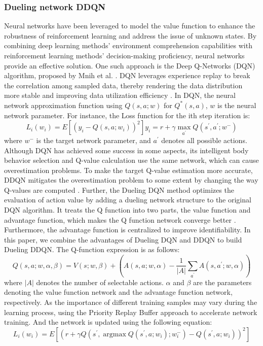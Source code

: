 \documentclass[sn-mathphys]{sn-jnl}%
\theoremstyle{thmstyleone}%
\theoremstyle{thmstyletwo}%
\theoremstyle{thmstylethree}%
\begin{document}
\subsubsection{Dueling network DDQN}
Neural networks have been leveraged to model the value function to enhance the robustness of reinforcement learning and address the issue of unknown states. By combining deep learning methods' environment comprehension capabilities with reinforcement learning methods' decision-making proficiency, neural networks provide an effective solution. One such approach is the Deep Q-Networks (DQN) algorithm, proposed by Mnih et al. \cite{mnihPlayingAtariDeep2013a}. DQN leverages experience replay to break the correlation among sampled data, thereby rendering the data distribution more stable and improving data utilization efficiency \cite{mnihPlayingAtariDeep2013a}. In DQN, the neural network approximation function using $Q(s,a;w)$ for $ Q^*(s,a) $, $ w $ is the neural network parameter. For instance, the Loss function for the ith step iteration is:
\begin{equation}
L_i(w_i)=E[(y_i-Q(s,a;w_i))^2]
y_i=r+\gamma \max _{a^{\prime}} Q\left(s^{\prime}, a^{\prime} ; w^{-}\right)
\end{equation}
where $w^-$ is the target network parameter, and $ a^{\prime} $ denotes all possible actions.
Although DQN has achieved some success in some aspects, its intelligent body behavior selection and Q-value calculation use the same network, which can cause overestimation problems. To make the target Q-value estimation more accurate, DDQN mitigates the overestimation problem to some extent by changing the way Q-values are computed \cite{vanhasseltDeepReinforcementLearning2016}. Further, the Dueling DQN method optimizes the evaluation of action value by adding a dueling network structure to the original DQN algorithm. It treats the Q function into two parts, the value function and advantage function, which makes the Q function network converge better \cite{wangDuelingNetworkArchitectures2016}.
Furthermore, the advantage function is centralized to improve identifiability. In this paper, we combine the advantages of Dueling DQN and DDQN to build Dueling DDQN. The Q-function expression is as follows:
\begin{equation}
\label{eq:net}
Q(s, a ; w, \alpha, \beta)=V(s ; w, \beta)+\left(A(s, a ; w, \alpha)-\frac{1}{\lvert A \rvert} \sum_{a^{\prime}} A\left(s, a^{\prime} ; w, \alpha\right)\right)
\end{equation}
where $ \lvert A \rvert $ denotes the number of selectable actions. $ \alpha $ and $ \beta $ are the parameters denoting the value function network and the advantage function network, respectively. As the importance of different training samples may vary during the learning process,  using the Priority Replay Buffer approach to accelerate network training\cite{schaulPrioritizedExperienceReplay2015}. And the network is updated using the following equation:
\begin{equation}
L_{i}\left(w_{i}\right)=E\left[\left(r+\gamma Q\left(s^{\prime}, \operatorname{argmax} Q\left(s^{\prime}, a ; w_{i}\right) ; w_{i}^{-}\right)-Q\left(s^{\prime}, a ; w_{i}\right)\right)^{2}\right]
\end{equation}
\end{document}
